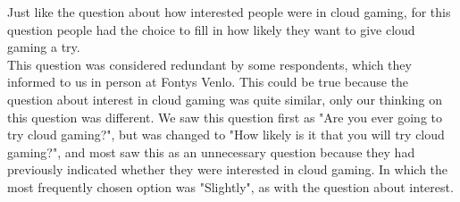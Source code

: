 Just like the question about how interested people were in cloud gaming, for this question people had the choice to fill in how likely they want to give cloud gaming a try.\\
This question was considered redundant by some respondents, which they informed to us in person at Fontys Venlo. This could be true because the question about interest in cloud gaming was quite similar, only our thinking on this question was different. We saw this question first as "Are you ever going to try cloud gaming?", but was changed to "How likely is it that you will try cloud gaming?", and most saw this as an unnecessary question because they had previously indicated whether they were interested in cloud gaming. In which the most frequently chosen option was "Slightly", as with the question about interest.
\\
